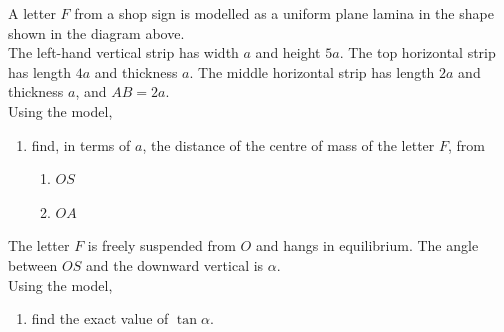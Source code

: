 \documentclass[leqno]{article}
\begin{document}
\begin{enumerate}[
  label=\textbf{\arabic*.},
  leftmargin=*,
  topsep=0pt,
  partopsep=0pt,
  parsep=0pt
]
\begin{figure}[H]
\end{figure}


A letter $F$ from a shop sign is modelled as a uniform plane lamina in the shape shown in the diagram above. \\

The left-hand vertical strip has width $a$ and height $5a$. The top horizontal strip has length $4a$ and thickness $a$. The middle horizontal strip has length $2a$ and thickness $a$, and $AB=2a$. \\

Using the model, \\
\begin{enumerate}[label=\textbf{(\alph*)}]
  \item find, in terms of $a$, the distance of the centre of mass of the letter $F$, from
  \begin{enumerate}[label=(\roman*)]
    \item $OS$
    \item $OA$
  \end{enumerate}
\end{enumerate}
The letter $F$ is freely suspended from $O$ and hangs in equilibrium. The angle between $OS$ and the downward vertical is $\alpha$. \\

Using the model, \\
\begin{enumerate}[label=\textbf{(\alph*)}, resume]
  \item find the exact value of $\tan\alpha$.  \\
\end{enumerate}

\newpage

\questionitem

\begin{figure}[H]
    \centering
{}
\end{figure}
\end{enumerate}
\end{document}
